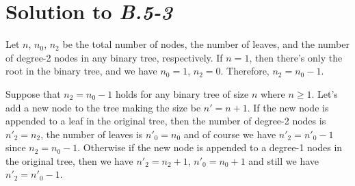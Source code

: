 \documentclass[a4paper, fleqn]{article}
\begin{document}
\section*{Solution to \textbf{\textit{B.5-3}}}
Let $n$, $n_0$, $n_2$ be the total number of nodes, the number of leaves, and the number of degree-2 nodes 
in any binary tree, respectively. If $n = 1$, then there's only the root in the binary tree, and we have 
$n_0 = 1$, $n_2 = 0$. Therefore, $n_2 = n_0 - 1$.

Suppose that $n_2 = n_0 - 1$ holds for any binary tree of size $n$ where $n \geq 1$. Let's add a new node 
to the tree making the size be $n' = n + 1$. If the new node is appended to a leaf in the original tree, 
then the number of degree-2 nodes is $n'_2 = n_2$, the number of leaves is $n'_0 = n_0$ and of course we 
have $n'_2 = n'_0 - 1$ since $n_2 = n_0 - 1$. Otherwise if the new node is appended to a degree-1 nodes in 
the original tree, then we have $n'_2 = n_2 + 1$, $n'_0 = n_0 + 1$ and still we have $n'_2 = n'_0 - 1$.
\end{document}
